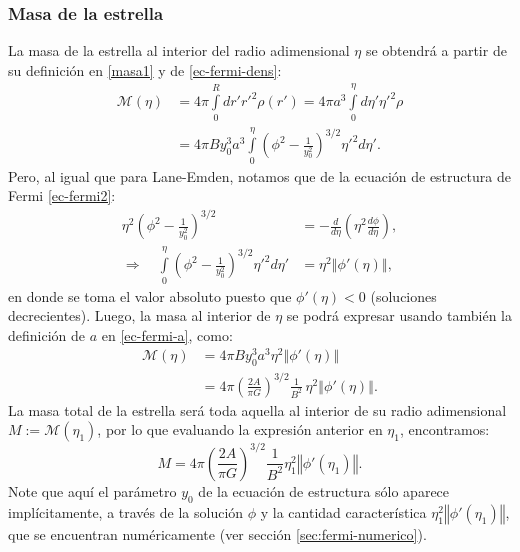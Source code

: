 \subsubsection{Masa de la estrella}

La masa de la estrella al interior del radio adimensional $\eta$ se obtendrá a partir de su definición en \eqref{masa1} y de \eqref{ec-fermi-dens}:
\begin{align}
 \mathcal{M}(\eta)&=4\pi\int\limits^R_{0}dr'r'^2\rho(r')=4\pi a^3\int\limits^{\eta}_{0}d\eta' \eta'^2\rho\\
&=4\pi B y_0^3 a^3\int\limits^{\eta}_{0} \left(\phi^2-\frac{1}{y_0^2}\right)^{3/2}\eta'^2d\eta'.
\end{align}
Pero, al igual que para Lane-Emden, notamos que de la ecuación de estructura de Fermi  \eqref{ec-fermi2}:
\begin{align}
 \eta^2\left(\phi^2-\frac{1}{y_0^2}\right)^{3/2}&=-\frac{d}{d\eta}\left(\eta^2\frac{d\phi}{d\eta}\right),\\
\Rightarrow\quad \int\limits^{\eta}_{0} \left(\phi^2-\frac{1}{y_0^2}\right)^{3/2}\eta'^2d\eta'&=\eta^2\left\Vert\phi'(\eta)\right\Vert,
\end{align}
en donde se toma el valor absoluto puesto que $\phi'(\eta)<0$ (soluciones decrecientes). Luego, la masa al interior de $\eta$ se podrá expresar usando también la definición de $a$ en \eqref{ec-fermi-a}, como:
\begin{align}
\mathcal{M}(\eta)&=4\pi B y_0^3 a^3\eta^2\left\Vert\phi'(\eta)\right\Vert\label{ec-fermi-masaparcial1}\\
&=4\pi\left(\frac{2A}{\pi G}\right)^{3/2}\frac{1}{B^2}\,\eta^2\left\Vert\phi'(\eta)\right\Vert\label{ec-fermi-masaparcial2}.
\end{align}
La masa total  de la estrella será toda aquella al interior de su radio adimensional $M:=\mathcal{M}(\eta_1)$, por lo que evaluando la expresión anterior en $\eta_1$, encontramos:
\begin{equation}\label{ec-fermi-masatotal}
\boxed{
 M=4\pi\left(\frac{2A}{\pi G}\right)^{3/2}\frac{1}{B^2}\eta_1^2\left\Vert\phi'(\eta_1)\right\Vert.}
\end{equation}
Note que aquí el parámetro $y_0$ de la ecuación de estructura sólo aparece implícitamente, a través de la solución $\phi$ y la cantidad característica $\eta_1^2\left\Vert\phi'(\eta_1)\right\Vert$, que se encuentran numéricamente (ver sección \eqref{sec:fermi-numerico}).

